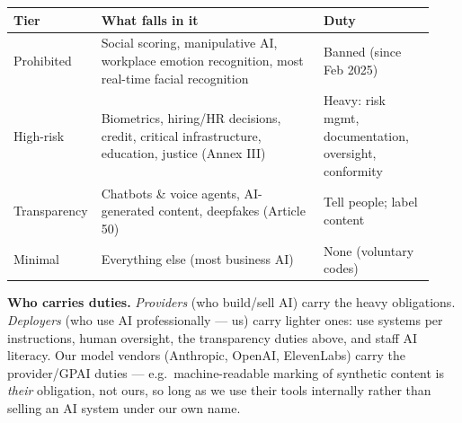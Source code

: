 \documentclass[11pt]{article}
\begin{document}
\begin{center}
\begin{tabular}{@{}p{0.15\linewidth}p{0.52\linewidth}p{0.26\linewidth}@{}}
\toprule
\textbf{\color{ebgreen}Tier} & \textbf{\color{ebgreen}What falls in it} & \textbf{\color{ebgreen}Duty} \\
\midrule
Prohibited & Social scoring, manipulative AI, workplace emotion recognition, most real-time facial recognition & Banned (since Feb 2025) \\
\addlinespace
High-risk & Biometrics, hiring/HR decisions, credit, critical infrastructure, education, justice (Annex III) & Heavy: risk mgmt, documentation, oversight, conformity \\
\addlinespace
Transparency & Chatbots \& voice agents, AI-generated content, deepfakes (Article 50) & Tell people; label content \\
\addlinespace
Minimal & Everything else (most business AI) & None (voluntary codes) \\
\bottomrule
\end{tabular}
\end{center}

\vspace{0.2cm}
\noindent\textbf{Who carries duties.} \emph{Providers} (who build/sell AI) carry
the heavy obligations. \emph{Deployers} (who use AI professionally --- us) carry
lighter ones: use systems per instructions, human oversight, the transparency
duties above, and staff AI literacy. Our model vendors (Anthropic, OpenAI,
ElevenLabs) carry the provider/GPAI duties --- e.g.\ machine-readable marking of
synthetic content is \emph{their} obligation, not ours, so long as we use their
tools internally rather than selling an AI system under our own name.

\vspace{0.2cm}
\begin{center}
\end{center}
\end{document}
